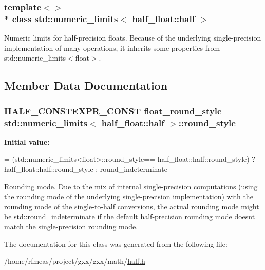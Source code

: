 \subsubsection*{template$<$$>$\\*
class std\+::numeric\+\_\+limits$<$ half\+\_\+float\+::half $>$}

Numeric limits for half-\/precision floats. Because of the underlying single-\/precision implementation of many operations, it inherits some properties from {\ttfamily std\+::numeric\+\_\+limits$<$float$>$}. 

\subsection{Member Data Documentation}
\subsubsection[{\texorpdfstring{round\+\_\+style}{round_style}}]{\setlength{\rightskip}{0pt plus 5cm}H\+A\+L\+F\+\_\+\+C\+O\+N\+S\+T\+E\+X\+P\+R\+\_\+\+C\+O\+N\+ST float\+\_\+round\+\_\+style std\+::numeric\+\_\+limits$<$ {\bf half\+\_\+float\+::half} $>$\+::round\+\_\+style\hspace{0.3cm}{\ttfamily [static]}}\hypertarget{classstd_1_1numeric__limits_3_01half__float_1_1half_01_4_a17a70ce9e02f8b890a0ebf5eb04c385b}{}\label{classstd_1_1numeric__limits_3_01half__float_1_1half_01_4_a17a70ce9e02f8b890a0ebf5eb04c385b}
{\bfseries Initial value\+:}
\begin{DoxyCode}
= (std::numeric\_limits<float>::round\_style==
            half\_float::half::round\_style) ? half\_float::half::round\_style : round\_indeterminate
\end{DoxyCode}
Rounding mode. Due to the mix of internal single-\/precision computations (using the rounding mode of the underlying single-\/precision implementation) with the rounding mode of the single-\/to-\/half conversions, the actual rounding mode might be {\ttfamily std\+::round\+\_\+indeterminate} if the default half-\/precision rounding mode doesn\textquotesingle{}t match the single-\/precision rounding mode. 

The documentation for this class was generated from the following file\+:\begin{DoxyCompactItemize}
\item 
/home/rfmeas/project/gxx/gxx/math/\hyperlink{half_8h}{half.\+h}\end{DoxyCompactItemize}
